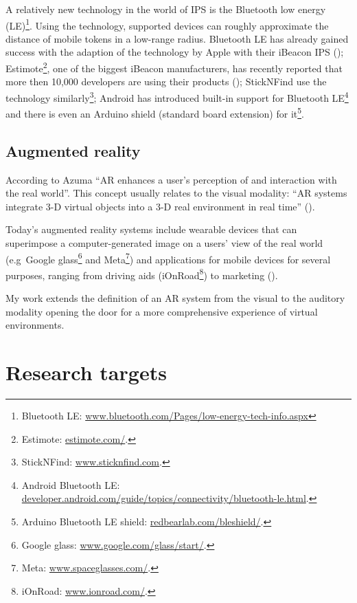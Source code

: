 \documentclass[a4paper,11pt]{article}
\begin{document}
A relatively new technology in the world of IPS is the Bluetooth low energy (LE)\footnote{Bluetooth LE: \href{http://www.bluetooth.com/Pages/low-energy-tech-info.aspx}{www.bluetooth.com/Pages/low-energy-tech-info.aspx}}.
Using the technology, supported devices can roughly approximate the distance of mobile tokens in a low-range radius.
Bluetooth LE has already gained success with the adaption of the technology by Apple with their iBeacon IPS (\cite{web:danova});
Estimote\footnote{Estimote: \href{http://estimote.com/}{estimote.com/}.}, one of the biggest iBeacon manufacturers, has recently reported that more then 10,000 developers are using their products (\cite{web:thompson});
StickNFind use the technology similarly\footnote{StickNFind: \href{https://www.sticknfind.com}{www.sticknfind.com}.};
Android has introduced built-in support for Bluetooth LE\footnote{Android Bluetooth LE: \href{http://developer.android.com/guide/topics/connectivity/bluetooth-le.html}{developer.android.com/guide/topics/connectivity/bluetooth-le.html}.} and there is even an Arduino shield (standard board extension) for it\footnote{Arduino Bluetooth LE shield: \href{http://redbearlab.com/bleshield/}{redbearlab.com/bleshield/}.}.

\subsection{Augmented reality}

According to Azuma ``AR enhances a user's perception of and interaction with the real world''.
This concept usually relates to the visual modality: ``AR systems integrate 3-D virtual objects into a 3-D real environment in real time'' (\cite{azuma97}).

Today's augmented reality systems include wearable devices that can superimpose a computer-generated image on a users' view of the real world (e.g\ Google glass\footnote{Google glass: \href{http://www.google.com/glass/start/}{www.google.com/glass/start/}.} and Meta\footnote{Meta: \href{https://www.spaceglasses.com/}{www.spaceglasses.com/}.}) and applications for mobile devices for several purposes, ranging from driving aids (iOnRoad\footnote{iOnRoad: \href{http://www.ionroad.com/}{www.ionroad.com/}.}) to marketing (\cite{ikea}).

My work extends the definition of an AR system from the visual to the auditory modality opening the door for a more comprehensive experience of virtual environments.

\section{Research targets}
\end{document}
